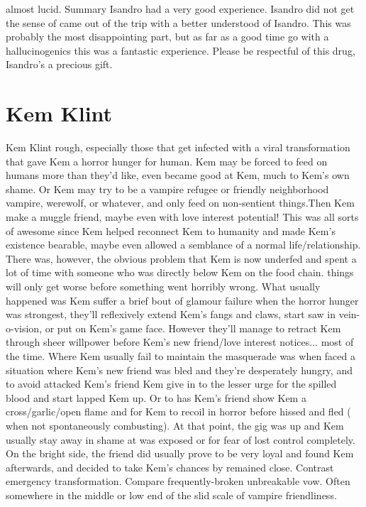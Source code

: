 \documentclass[12pt]{book}
\begin{document}
almost lucid. Summary Isandro had a very good experience. Isandro did not get the sense of came out of the trip with a better understood of Isandro. This was probably the most disappointing part, but as far as a good time go with a hallucinogenics this was a fantastic experience. Please be respectful of this drug, Isandro's a precious gift.



\chapter{Kem Klint}

Kem Klint rough, especially those that get infected with a viral transformation that gave Kem a horror hunger for human. Kem may be forced to feed on humans more than they'd like, even became good at Kem, much to Kem's own shame. Or Kem may try to be a vampire refugee or friendly neighborhood vampire, werewolf, or whatever, and only feed on non-sentient things.Then Kem make a muggle friend, maybe even with love interest potential! This was all sorts of awesome since Kem helped reconnect Kem to humanity and made Kem's existence bearable, maybe even allowed a semblance of a normal life/relationship. There was, however, the obvious problem that Kem is now underfed and spent a lot of time with someone who was directly below Kem on the food chain. things will only get worse before something went horribly wrong. What usually happened was Kem suffer a brief bout of glamour failure when the horror hunger was strongest, they'll reflexively extend Kem's fangs and claws, start saw in vein-o-vision, or put on Kem's game face. However they'll manage to retract Kem through sheer willpower before Kem's new friend/love interest notices... most of the time. Where Kem usually fail to maintain the masquerade was when faced a situation where Kem's new friend was bled and they're desperately hungry, and to avoid attacked Kem's friend Kem give in to the lesser urge for the spilled blood and start lapped Kem up. Or to has Kem's friend show Kem a cross/garlic/open flame and for Kem to recoil in horror before hissed and fled ( when not spontaneously combusting). At that point, the gig was up and Kem usually stay away in shame at was exposed or for fear of lost control completely. On the bright side, the friend did usually prove to be very loyal and found Kem afterwards, and decided to take Kem's chances by remained close. Contrast emergency transformation. Compare frequently-broken unbreakable vow. Often somewhere in the middle or low end of the slid scale of vampire friendliness.
\end{document}
